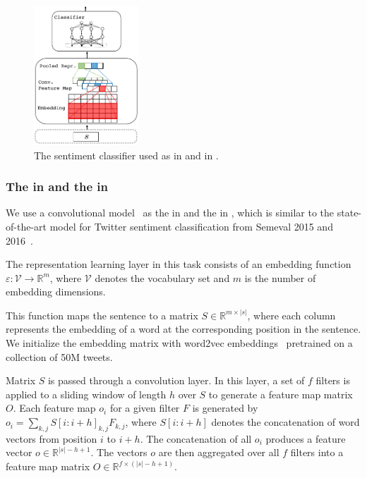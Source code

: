 \begin{figure}[t!]
    \centering
            \includegraphics[width=0.35\textwidth]{03-part-02/chapter-05/figs_and_tables/fig_sentiment.pdf}
    \caption{The sentiment classifier used as \tch in \cws and \std in \fwl.}
    \label{fig:sentiment}
\end{figure}


\subsubsection{The \tnet in \cws and the \std in \fwl}
We use a convolutional model~\citep{Kim:2014} as the \tnet in \cws and the \std in \fwl, which is similar to the state-of-the-art model for Twitter sentiment classification from Semeval 2015 and 2016~\cite{Severyn:2015:SemEval,Deriu2016:SemEval,Deriu:2017,Severyn:2015:SIGIR}.

The representation learning layer in this task consists of an embedding function $\varepsilon: \mathcal{V} \rightarrow \mathbb{R}^{m}$, where $\mathcal{V}$ denotes the vocabulary set and $m$ is the number of embedding dimensions.

This function maps the sentence to a matrix $S \in \mathbb{R}^{m \times |s|}$, where each column represents the embedding of a word at the corresponding position in the sentence. We initialize the embedding matrix with word2vec embeddings~\cite{Mikolov:2013} pretrained on a collection of 50M tweets.

Matrix $S$ is passed through a convolution layer.  In this layer, a set of $f$ filters is applied to a sliding window of length $h$ over $S$ to generate a feature map matrix $O$. Each feature map $o_i$ for a given filter $F$ is generated by $o_i = \sum_{k,j}S[i:i+h]_{k,j} F_{k,j}$, where $S[i:i+h]$ denotes the concatenation of word vectors from position $i$ to $i+h$. The concatenation of all $o_i$ produces a feature vector $o \in \mathbb{R}^{|s|-h+1}$. The vectors $o$ are then aggregated over all $f$ filters into a feature map matrix $O \in \mathbb{R}^{f\times(|s|-h+1)}$.

